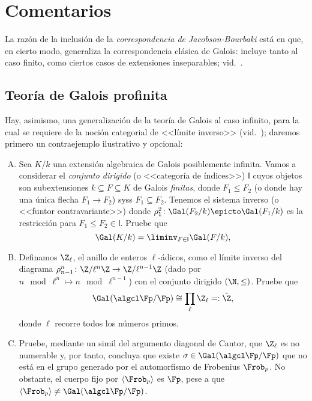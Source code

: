 \documentclass[11pt, reqno]{amsart}
\begin{document}
\appendix
\section{Comentarios}
La razón de la inclusión de la \emph{correspondencia de Jacobson-Bourbaki} está en que, en cierto modo, generaliza la correspondencia
clásica de Galois: incluye tanto al caso finito, como ciertos casos de extensiones inseparables; vid.\ \cite{jacobson:galois}.

\subsection{Teoría de Galois profinita}
Hay, asimismo,
\lookup
una generalización de la teoría de Galois al caso infinito, para la cual se requiere de la noción categorial de <<límite
inverso>> (vid.\ \cite[490]{aluffi:algebra});
daremos primero un contraejemplo ilustrativo y opcional:
\begin{enumerate}[A., ref=\Alph*]
	\item\label{ex:galois_as_inv_lim}
		Sea $K/k$ una extensión algebraica de Galois posiblemente infinita.
		Vamos a considerar el \emph{conjunto dirigido} (o <<categoría de índices>>) $\mathsf{I}$ cuyos objetos son subextensiones $k
		\subseteq F \subseteq K$ de Galois \emph{finitas}, donde $F_1 \le F_2$ (o donde hay una única flecha $F_1 \to F_2$) syss
		$F_1 \subseteq F_2$.
		Tenemos el sistema inverso (o <<funtor contravariante>>) donde $\rho^2_1 \colon \Gal(F_2/k) \epicto \Gal(F_1/k)$ es la
		restricción para $F_1 \le F_2 \in \mathsf{I}$.
		Pruebe que
		\[
			\Gal(K/k) = \liminv_{F \in \mathsf{I}} \Gal(F/k),
		\]

	\item Definamos $\Z_\ell$, el anillo de enteros $\ell$-ádicos, como el límite inverso del diagrama $\rho^n_{n-1}\colon \Z/\ell^n\Z \to
		\Z/\ell^{n-1}\Z$ (dado por $n \mod{\ell^n} \mapsto n \mod{\ell^{n-1}}$) con el conjunto dirigido $(\N, \le)$.
		Pruebe que
		\[
			\Gal(\algcl\Fp/\Fp) \cong \prod_{\ell} \Z_\ell =: \hat{\Z},
		\]
		donde $\ell$ recorre todos los números primos.

	\item\label{ex:frobenius_dense}
		Pruebe, mediante un simil del argumento diagonal de Cantor, que $\Z_\ell$ es no numerable y, por tanto, concluya que existe
		$\sigma \in \Gal(\algcl\Fp/\Fp)$ que no está en el grupo generado por el automorfismo de Frobenius $\Frob_p$.
		No obstante, el cuerpo fijo por $\langle \Frob_p \rangle$ es $\Fp$, pese a que $\langle \Frob_p \rangle \ne
		\Gal(\algcl\Fp/\Fp)$.
\end{enumerate}
\end{document}
